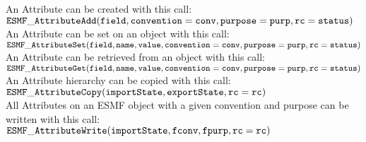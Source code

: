 %

An Attribute can be created with this call: \\ 
 ${\tt ESMF\_AttributeAdd(field, convention=conv, purpose=purp, rc=status)}$\\

An Attribute can be set on an object with this call: \\
 ${\tt ESMF\_AttributeSet(field, name, value, convention=conv, purpose=purp, rc=status)}$\\

An Attribute can be retrieved from an object with this call: \\
 ${\tt ESMF\_AttributeGet(field, name, value, convention=conv, purpose=purp, rc=status)}$\\

An Attribute hierarchy can be copied with this call: \\
 ${\tt ESMF\_AttributeCopy(importState, exportState, rc=rc)}$\\

All Attributes on an ESMF object with a given convention and purpose can be written with this call: \\
 ${\tt ESMF\_AttributeWrite(importState,fconv,fpurp,rc=rc)}$\\

